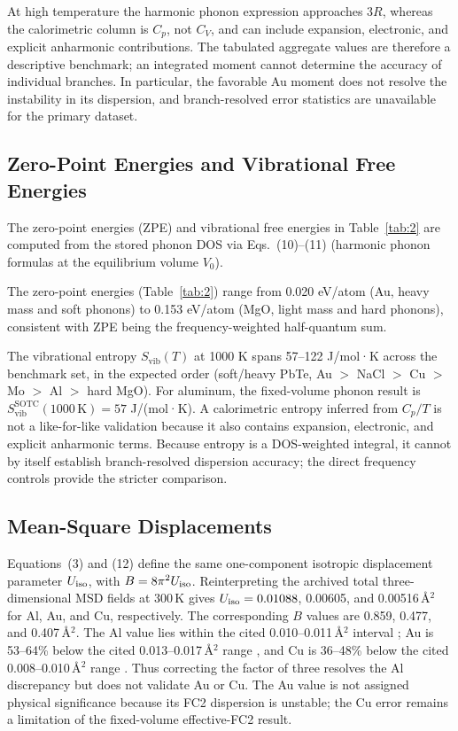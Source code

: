 \documentclass[aps,prb,reprint,amsmath,amssymb,floatfix]{revtex4-2}
\begin{document}
At high temperature the harmonic phonon expression approaches \(3R\), whereas
the calorimetric column is \(C_p\), not \(C_V\), and can include expansion,
electronic, and explicit anharmonic contributions. The tabulated aggregate values are therefore a descriptive benchmark;
an integrated moment cannot determine the accuracy of individual branches. In
particular, the favorable Au moment does not resolve the instability in its
dispersion, and branch-resolved error statistics are unavailable for the
primary dataset.

\subsection{Zero-Point Energies and Vibrational Free
Energies}\label{zero-point-energies-and-vibrational-free-energies}

The zero-point energies (ZPE) and vibrational free energies
in Table~\ref{tab:2} are computed from the stored phonon DOS via
Eqs.~(10)--(11) (harmonic phonon formulas at the equilibrium volume
\(V_0\)).

The zero-point energies (Table~\ref{tab:2}) range from 0.020 eV/atom (Au, heavy
mass and soft phonons) to 0.153 eV/atom (MgO, light mass and hard phonons),
consistent with ZPE being the frequency-weighted half-quantum sum.

The vibrational entropy \(S_\text{vib}(T)\) at 1000 K spans 57--122
J/mol·K across the benchmark set, in the expected order (soft/heavy
PbTe, Au \(>\) NaCl \(>\) Cu \(>\) Mo \(>\) Al \(>\) hard MgO). For aluminum,
the fixed-volume phonon result is
\(S_\text{vib}^\text{SOTC}(1000\,\text{K}) = 57\) J/(mol·K). A calorimetric
entropy inferred from \(C_p/T\) is not a like-for-like validation because it
also contains expansion, electronic, and explicit anharmonic terms. Because
entropy is a DOS-weighted integral, it cannot by itself establish
branch-resolved dispersion accuracy; the direct frequency controls provide the
stricter comparison.

\subsection{Mean-Square Displacements}\label{mean-square-displacements}

Equations~(3) and (12) define the same one-component isotropic displacement
parameter \(U_{\rm iso}\), with \(B=8\pi^2U_{\rm iso}\). Reinterpreting the archived total three-dimensional MSD fields at 300\,K gives \(U_{\rm iso}=0.01088\),
0.00605, and 0.00516\,\AA\(^2\) for Al, Au, and Cu, respectively. The
corresponding \(B\) values are 0.859, 0.477, and 0.407\,\AA\(^2\). The Al
value lies within the cited 0.010--0.011\,\AA\(^2\) interval
\cite{ref36}; Au is 53--64\% below the cited 0.013--0.017\,\AA\(^2\)
range \cite{ref37}, and Cu is 36--48\% below the cited
0.008--0.010\,\AA\(^2\) range \cite{ref38}. Thus correcting the factor of
three resolves the Al discrepancy but does not validate Au or Cu. The Au value
is not assigned physical significance because its FC2 dispersion is unstable;
the Cu error remains a limitation of the fixed-volume effective-FC2 result.
\end{document}
